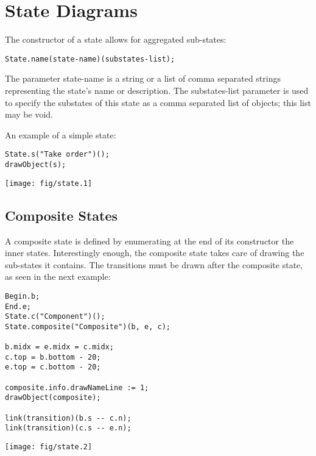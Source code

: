 \documentclass{article}
\newcommand{\code}{\ttfamily}
\begin{document}
\section{State Diagrams}

The constructor of a state allows for aggregated sub-states:

\begin{verbatim}
State.name(state-name)(substates-list);
\end{verbatim}

The parameter {\code state-name} is a string or a list of comma separated strings representing
the state's name or description. The {\code substates-list} parameter is used to specify
the substates of this state as a comma separated list of objects; this list may be void.

An example of a simple state:

\begin{multicols}{2}
\begin{verbatim}
State.s("Take order")();
drawObject(s);
\end{verbatim}
\columnbreak
\hspace{1cm}\texttt{[image: fig/state.1]}
\end{multicols}


\subsection{Composite States}
\label{composite-states}

A composite state is defined by enumerating at the end of its constructor the inner
states. Interestingly enough, the composite state takes care of drawing the sub-states it
contains. The transitions must be drawn after the composite state, as seen in the
next example:

\begin{multicols}{2}
\begin{verbatim}
Begin.b;
End.e;
State.c("Component")();
State.composite("Composite")(b, e, c);

b.midx = e.midx = c.midx;
c.top = b.bottom - 20;
e.top = c.bottom - 20;

composite.info.drawNameLine := 1;
drawObject(composite);

link(transition)(b.s -- c.n);
link(transition)(c.s -- e.n);
\end{verbatim}
\columnbreak
\hspace{1cm}\texttt{[image: fig/state.2]}
\end{multicols}
\end{document}
